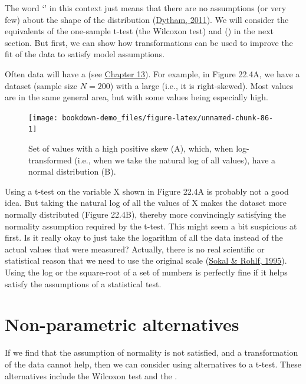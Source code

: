 \documentclass[
  openany]{krantz}
\begin{document}
The word `' in this context just means that there are no assumptions (or very few) about the shape of the distribution (\protect\hyperlink{ref-Dytham2011}{Dytham, 2011}).
We will consider the  equivalents of the one-sample t-test (the Wilcoxon test) and  () in the next section.
But first, we can show how transformations can be used to improve the fit of the data to satisfy model assumptions.

Often data will have a  (see \protect\hyperlink{Chapter_13}{Chapter 13}).
For example, in Figure 22.4A, we have a dataset (sample size \(N = 200\)) with a large  (i.e., it is right-skewed).
Most values are in the same general area, but with some values being especially high.

\begin{figure}
\texttt{[image: bookdown-demo\_files/figure-latex/unnamed-chunk-86-1]} \caption{Set of values with a high positive skew (A), which, when log-transformed (i.e., when we take the natural log of all values), have a normal distribution (B).}\label{fig:unnamed-chunk-86}
\end{figure}

Using a t-test on the variable X shown in Figure 22.4A is probably not a good idea.
But taking the natural log of all the values of X makes the dataset more normally distributed (Figure 22.4B), thereby more convincingly satisfying the normality assumption required by the t-test.
This might seem a bit suspicious at first.
Is it really okay to just take the logarithm of all the data instead of the actual values that were measured?
Actually, there is no real scientific or statistical reason that we need to use the original scale (\protect\hyperlink{ref-Sokal1995}{Sokal \& Rohlf, 1995}).
Using the log or the square-root of a set of numbers is perfectly fine if it helps satisfy the assumptions of a statistical test.

\hypertarget{non-parametric-alternatives}{%
\section{Non-parametric alternatives}\label{non-parametric-alternatives}}

If we find that the assumption of normality is not satisfied, and a transformation of the data cannot help, then we can consider using  alternatives to a t-test.
These alternatives include the Wilcoxon test and the .
\end{document}
